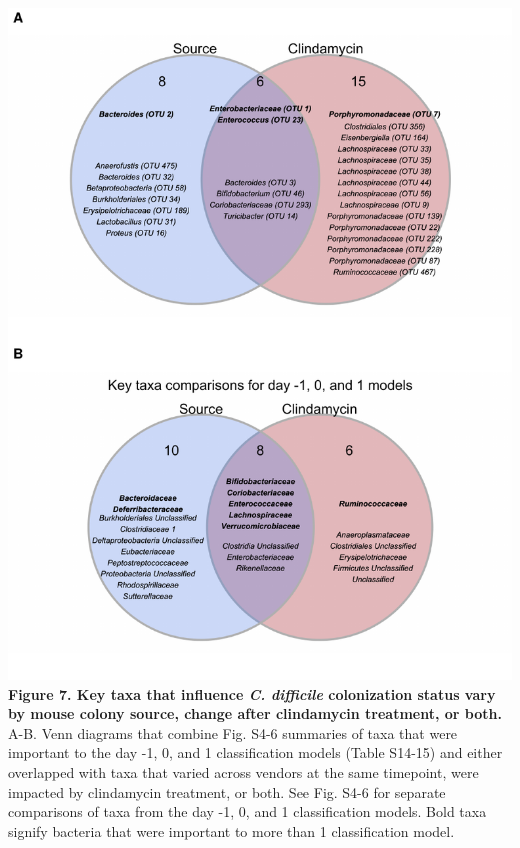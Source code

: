 \documentclass[11pt,]{article}
\begin{document}
\includegraphics{figure_7.pdf} \textbf{Figure 7. Key taxa that influence
\emph{C. difficile} colonization status vary by mouse colony source,
change after clindamycin treatment, or both.} A-B. Venn diagrams that
combine Fig. S4-6 summaries of taxa that were important to the day -1,
0, and 1 classification models (Table S14-15) and either overlapped with
taxa that varied across vendors at the same timepoint, were impacted by
clindamycin treatment, or both. See Fig. S4-6 for separate comparisons
of taxa from the day -1, 0, and 1 classification models. Bold taxa
signify bacteria that were important to more than 1 classification
model.

\newpage
\end{document}
